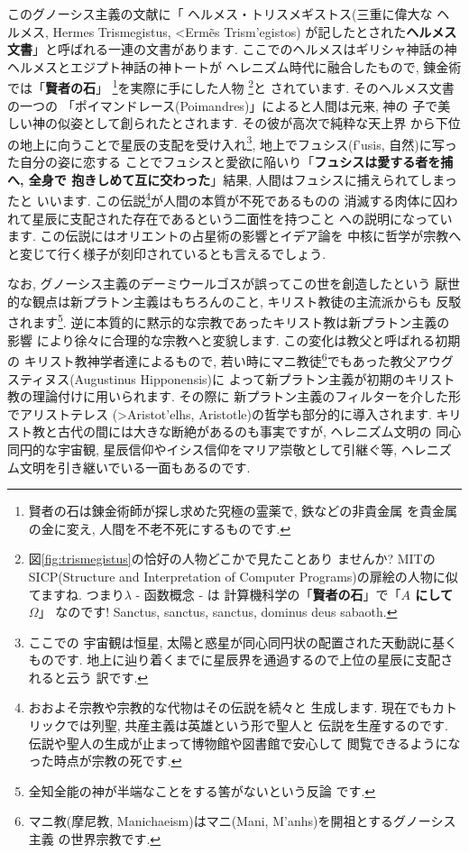このグノーシス主義の文献に「 ヘルメス・トリスメギストス(三重に偉大な
ヘルメス, Hermes Trismegistus, \textgreek{<Erm\~es Trism'egistos})
が記したとされた\textbf{ヘルメス文書}」と呼ばれる一連の文書があります.
 ここでのヘルメスはギリシャ神話の神ヘルメスとエジプト神話の神トートが
ヘレニズム時代に融合したもので, 錬金術では「\textbf{賢者の石}」
\footnote{賢者の石は錬金術師が探し求めた究極の霊薬で, 鉄などの非貴金属
を貴金属の金に変え, 人間を不老不死にするものです.}を実際に手にした人物
\footnote{図\ref{fig:trismegistus}の恰好の人物どこかで見たことあり
ませんか? MITのSICP(Structure and Interpretation of Computer
 Programs)の扉絵の人物に似てますね. つまり$\lambda$ - 函数概念 - は
計算機科学の「\textbf{賢者の石}」で「\textbf{$A$ にして $\Omega$}」
なのです! Sanctus, sanctus, sanctus, dominus deus sabaoth.}と
されています\cite{錬金術}. そのヘルメス文書の一つの
「ポイマンドレース(Poimandres)」\cite{柴田}によると人間は元来, 神の
子で美しい神の似姿として創られたとされます. その彼が高次で純粋な天上界
から下位の地上に向うことで星辰の支配を受け入れ\footnote{ここでの
宇宙観は恒星, 太陽と惑星が同心同円状の配置された天動説に基くものです.
 地上に辿り着くまでに星辰界を通過するので上位の星辰に支配されると云う
訳です.}, 地上でフュシス(\textgreek{f'usis}, 自然)に写った自分の姿に恋する
ことでフュシスと愛欲に陥いり「\textbf{フュシスは愛する者を捕へ, 全身で
抱きしめて互に交わった}」結果, 人間はフュシスに捕えられてしまったと
いいます. この伝説\footnote{おおよそ宗教や宗教的な代物はその伝説を続々と
生成します. 現在でもカトリックでは列聖, 共産主義は英雄という形で聖人と
伝説を生産するのです. 伝説や聖人の生成が止まって博物館や図書館で安心して
閲覧できるようになった時点が宗教の死です.}が人間の本質が不死であるものの
消滅する肉体に囚われて星辰に支配された存在であるという二面性を持つこと
への説明になっています. この伝説にはオリエントの占星術の影響とイデア論を
中核に哲学が宗教へと変じて行く様子が刻印されているとも言えるでしょう.
\newline

なお, グノーシス主義のデーミウールゴスが誤ってこの世を創造したという
厭世的な観点は新プラトン主義はもちろんのこと, キリスト教徒の主流派からも
反駁されます\footnote{全知全能の神が半端なことをする筈がないという反論
です.}. 逆に本質的に黙示的な宗教であったキリスト教は新プラトン主義の影響
により徐々に合理的な宗教へと変貌します. この変化は教父と呼ばれる初期の
キリスト教神学者達によるもので, 若い時にマニ教徒\footnote{マニ教(摩尼教,
 Manichaeism)はマニ(Mani, \textgreek{M'anhs})を開祖とするグノーシス主義
の世界宗教です.}でもあった教父アウグスティヌス(Augustinus Hipponensis)に
よって新プラトン主義が初期のキリスト教の理論付けに用いられます. その際に
新プラトン主義のフィルターを介した形でアリストテレス
(\textgreek{>Aristot'elhs}, Aristotle)の哲学も部分的に導入されます.
 キリスト教と古代の間には大きな断絶があるのも事実ですが, ヘレニズム文明の
同心同円的な宇宙観, 星辰信仰やイシス信仰をマリア崇敬として引継ぐ等,
 ヘレニズム文明を引き継いでいる一面もあるのです.
\newline

